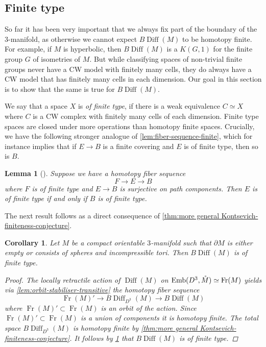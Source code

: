 \documentclass{amsart}
\theoremstyle{plain}
\newtheorem{lem}[thm]{Lemma}
\newtheorem{cor}[thm]{Corollary}
\theoremstyle{definition}
\DeclareMathOperator\Diff{Diff}
\DeclareMathOperator\emb{Emb}
\DeclareMathOperator\Fr{Fr}
\newcommand{\interior}[1]{\smash{\mathring{#1}}}
\newcommand{\BDiff}{B\!\Diff}
\begin{document}
\subsection{Finite type}\label{subsection - finite type}
So far it has been very important that we always fix part of the boundary of the $3$-manifold, as otherwise we cannot expect $\BDiff(M)$ to be homotopy finite.
For example, if $M$ is hyperbolic, then $\BDiff(M)$ is a $K(G,1)$ for the finite group $G$ of isometries of $M$.
But while classifying spaces of non-trivial finite groups never have a CW model with finitely many cells, they do always have a CW model that has finitely many cells in each dimension.
Our goal in this section is to show that the same is true for $\BDiff(M)$.

We say that a space $X$ is \emph{of finite type}, if there is a weak equivalence $C \simeq X$ where $C$ is a CW complex with finitely many cells of each dimension.
Finite type spaces are closed under more operations than homotopy finite spaces.
Crucially, we have the following stronger analogue of \cref{lem:fiber-sequence-finite}, which for instance implies that if $E \to B$ is a finite covering and $E$ is of finite type, then so is $B$.

\begin{lem}[{\cite[Proposition 2.5]{DrorDwyerKan81}}]\label{lem:finite-type-fiberseq}
    Suppose we have a homotopy fiber sequence
    \[
        F \longrightarrow E \longrightarrow B
    \]
    where $F$ is of finite type and $E \to B$ is surjective on path components.
    Then $E$ is of finite type if \emph{and only if} $B$ is of finite type.
\end{lem}


The next result follows as a direct consequence of \cref{thm:more general Kontsevich-finiteness-conjecture}.

\begin{cor}\label{cor:finite-type-tori-and-spheres}
    Let $M$ be a compact orientable $3$-manifold such that $\partial M$ is either empty or consists of spheres and incompressible tori.
    Then $\BDiff(M)$ is of finite type.
\begin{proof}
    The locally retractile action of $\Diff(M)$ on $\emb(D^3, \interior{M}) \simeq \Fr(M)$ yields via \cref{lem:orbit-stabiliser-transitive} the homotopy fiber sequence
    \[
        \Fr(M)' \longrightarrow \BDiff_{D^3}(M) \longrightarrow \BDiff(M)
    \]
    where $\Fr(M)' \subset \Fr(M)$ is an orbit of the action.
    Since $\Fr(M)' \subset \Fr(M)$ is a union of components it is homotopy finite.
    The total space $\BDiff_{D^3}(M)$ is homotopy finite by \cref{thm:more general Kontsevich-finiteness-conjecture}.
    It follows by \cref{lem:finite-type-fiberseq} that $\BDiff(M)$ is of finite type.
\end{proof}
\end{cor}
\end{document}
